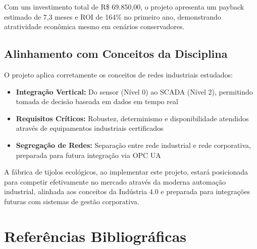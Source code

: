 \documentclass[12pt,a4paper]{article}
\begin{document}
Com um investimento total de R\$ 69.850,00, o projeto apresenta um payback estimado de 7,3 meses e ROI de 164\% no primeiro ano, demonstrando atratividade econômica mesmo em cenários conservadores.

\subsection{Alinhamento com Conceitos da Disciplina}

O projeto aplica corretamente os conceitos de redes industriais estudados:

\begin{itemize}
    \item \textbf{Integração Vertical:} Do sensor (Nível 0) ao SCADA (Nível 2), permitindo tomada de decisão baseada em dados em tempo real
    \item \textbf{Requisitos Críticos:} Robustez, determinismo e disponibilidade atendidos através de equipamentos industriais certificados
    \item \textbf{Segregação de Redes:} Separação entre rede industrial e rede corporativa, preparada para futura integração via OPC UA
\end{itemize}

A fábrica de tijolos ecológicos, ao implementar este projeto, estará posicionada para competir efetivamente no mercado através da moderna automação industrial, alinhada aos conceitos da Indústria 4.0 e preparada para integrações futuras com sistemas de gestão corporativa.

\section*{Referências Bibliográficas}
\end{document}
